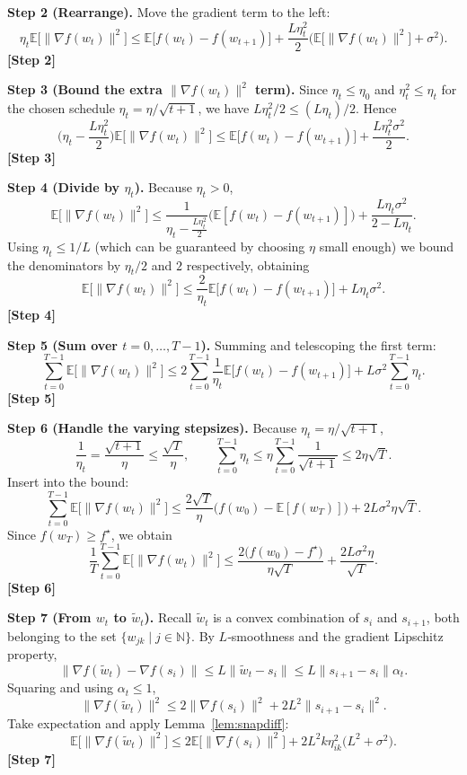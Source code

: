 \documentclass{article}
\newcommand{\E}{\mathbb{E}}
\begin{document}
\noindent\textbf{Step 2 (Rearrange).}  
Move the gradient term to the left:
\[
\eta_t\E\big[\|\nabla f(w_t)\|^{2}\big]\le\E\big[f(w_t)-f(w_{t+1})\big]
+\frac{L\eta_t^{2}}{2}\big(\E\big[\|\nabla f(w_t)\|^{2}\big]+\sigma^{2}\big).
\]
\textbf{[Step 2]}

\noindent\textbf{Step 3 (Bound the extra $\|\nabla f(w_t)\|^{2}$ term).}  
Since $\eta_t\le\eta_0$ and $\eta_t^{2}\le \eta_t$ for the chosen schedule $\eta_t=\eta/\sqrt{t+1}$, we have $L\eta_t^{2}/2\le (L\eta_t)/2$. Hence
\[
\Big(\eta_t-\frac{L\eta_t^{2}}{2}\Big)\E\big[\|\nabla f(w_t)\|^{2}\big]
\le\E\big[f(w_t)-f(w_{t+1})\big]+\frac{L\eta_t^{2}\sigma^{2}}{2}.
\]
\textbf{[Step 3]}

\noindent\textbf{Step 4 (Divide by $\eta_t$).}  
Because $\eta_t>0$,
\[
\E\big[\|\nabla f(w_t)\|^{2}\big]\le
\frac{1}{\eta_t-\frac{L\eta_t^{2}}{2}}\big(\E[f(w_t)-f(w_{t+1})]\big)
+\frac{L\eta_t\sigma^{2}}{2-\!L\eta_t}.
\]
Using $\eta_t\le 1/L$ (which can be guaranteed by choosing $\eta$ small enough) we bound the denominators by $ \eta_t/2$ and $2$ respectively, obtaining
\[
\E\big[\|\nabla f(w_t)\|^{2}\big]\le
\frac{2}{\eta_t}\E\big[f(w_t)-f(w_{t+1})\big]+L\eta_t\sigma^{2}.
\]
\textbf{[Step 4]}

\noindent\textbf{Step 5 (Sum over $t=0,\dots,T-1$).}  
Summing and telescoping the first term:
\[
\sum_{t=0}^{T-1}\E\big[\|\nabla f(w_t)\|^{2}\big]
\le
2\sum_{t=0}^{T-1}\frac{1}{\eta_t}\E\big[f(w_t)-f(w_{t+1})\big]
+L\sigma^{2}\sum_{t=0}^{T-1}\eta_t .
\]
\textbf{[Step 5]}

\noindent\textbf{Step 6 (Handle the varying stepsizes).}  
Because $\eta_t=\eta/\sqrt{t+1}$,
\[
\frac{1}{\eta_t}= \frac{\sqrt{t+1}}{\eta}\le \frac{\sqrt{T}}{\eta},\qquad
\sum_{t=0}^{T-1}\eta_t\le \eta\sum_{t=0}^{T-1}\frac{1}{\sqrt{t+1}}\le 2\eta\sqrt{T}.
\]
Insert into the bound:
\[
\sum_{t=0}^{T-1}\E\big[\|\nabla f(w_t)\|^{2}\big]
\le
\frac{2\sqrt{T}}{\eta}\big(f(w_0)-\E[f(w_T)]\big)+2L\sigma^{2}\eta\sqrt{T}.
\]
Since $f(w_T)\ge f^\star$, we obtain
\[
\frac{1}{T}\sum_{t=0}^{T-1}\E\big[\|\nabla f(w_t)\|^{2}\big]
\le
\frac{2\big(f(w_0)-f^\star\big)}{\eta\sqrt{T}}+ \frac{2L\sigma^{2}\eta}{\sqrt{T}}.
\]
\textbf{[Step 6]}

\noindent\textbf{Step 7 (From $w_t$ to $\tilde w_t$).}  
Recall $\tilde w_t$ is a convex combination of $s_i$ and $s_{i+1}$, both belonging to the set $\{w_{jk}\mid j\in\mathbb{N}\}$. By $L$‑smoothness and the gradient Lipschitz property,
\[
\|\nabla f(\tilde w_t)-\nabla f(s_i)\|\le L\|\tilde w_t-s_i\|\le L\|s_{i+1}-s_i\|\alpha_t .
\]
Squaring and using $\alpha_t\le1$,
\[
\|\nabla f(\tilde w_t)\|^{2}\le 2\|\nabla f(s_i)\|^{2}+2L^{2}\|s_{i+1}-s_i\|^{2}.
\]
Take expectation and apply Lemma~\ref{lem:snapdiff}:
\[
\E\big[\|\nabla f(\tilde w_t)\|^{2}\big]\le
2\E\big[\|\nabla f(s_i)\|^{2}\big]+2L^{2}k\eta_{ik}^{2}\big(L^{2}+\sigma^{2}\big).
\]
\textbf{[Step 7]}
\end{document}
